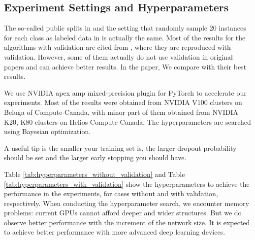 \documentclass{article}
\begin{document}
\begin{appendices}
\section{Experiment Settings and Hyperparameters}
\label{appendix:5}
The so-called public splits in \cite{liao2019lanczos} and the setting that randomly sample 20 instances for each class as labeled data in \cite{yang2016revisiting} is actually the same. Most of the results for the algorithms with validation are cited from \cite{liao2019lanczos}, where they are reproduced with validation. However, some of them actually do not use validation in original papers and can achieve better results. In the paper, We compare with their best results.

We use NVIDIA apex amp mixed-precision plugin for PyTorch to accelerate our experiments. Most of the results were obtained from NVIDIA V100 clusters on Beluga of Compute-Canada, with minor part of them obtained from NVIDIA K20, K80 clusters on Helios Compute-Canada. The hyperparameters are searched using Bayesian optimization.

A useful tip is the smaller your training set is, the larger dropout probability should be set and the larger early stopping you should have.

Table \ref{tab:hyperparameters_without_validation} and Table \ref{tab:hyperparameters_with_validation} show the hyperparameters to achieve the performance in the experiments, for cases without and with validation, respectively. When conducting the hyperparameter search, we encounter memory problems: current GPUs cannot afford deeper and wider structures. But we do observe better performance with the increment of the network size. It is expected to achieve better performance with more advanced deep learning devices.





\end{appendices}
\end{document}

